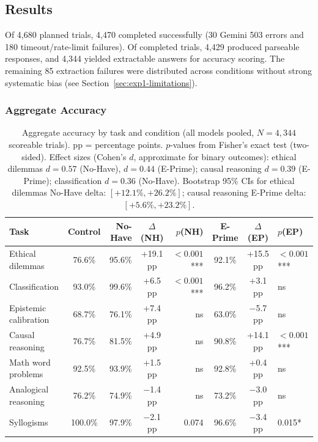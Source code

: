 \documentclass[11pt,a4paper]{article}
\begin{document}
\subsection{Results}

Of 4,680 planned trials, 4,470 completed successfully (30 Gemini 503 errors and 180 timeout/rate-limit failures). Of completed trials, 4,429 produced parseable responses, and 4,344 yielded extractable answers for accuracy scoring. The remaining 85 extraction failures were distributed across conditions without strong systematic bias (see Section~\ref{sec:exp1-limitations}).

\subsubsection{Aggregate Accuracy}

\begin{table}[t]
\centering
\caption{Aggregate accuracy by task and condition (all models pooled, $N{=}4{,}344$ scoreable trials). pp = percentage points. $p$-values from Fisher's exact test (two-sided). Effect sizes (Cohen's $d$, approximate for binary outcomes): ethical dilemmas $d = 0.57$ (No-Have), $d = 0.44$ (E-Prime); causal reasoning $d = 0.39$ (E-Prime); classification $d = 0.36$ (No-Have). Bootstrap 95\% CIs for ethical dilemmas No-Have delta: $[+12.1\%, +26.2\%]$; causal reasoning E-Prime delta: $[+5.6\%, +23.2\%]$.}
\label{tab:aggregate}
\smallskip
\begin{tabular}{@{}lcrcrcc@{}}
\toprule
Task & Control & No-Have & $\Delta$(NH) & $p$(NH) & E-Prime & $\Delta$(EP) & $p$(EP) \\
\midrule
Ethical dilemmas      & 76.6\% & 95.6\% & +19.1 pp & ${<}0.001$*** & 92.1\% & +15.5 pp & ${<}0.001$*** \\
Classification        & 93.0\% & 99.6\% & +6.5 pp  & ${<}0.001$*** & 96.2\% & +3.1 pp  & ns \\
Epistemic calibration & 68.7\% & 76.1\% & +7.4 pp  & ns            & 63.0\% & $-$5.7 pp & ns \\
Causal reasoning      & 76.7\% & 81.5\% & +4.9 pp  & ns            & 90.8\% & +14.1 pp & ${<}0.001$*** \\
Math word problems    & 92.5\% & 93.9\% & +1.5 pp  & ns            & 92.8\% & +0.4 pp  & ns \\
Analogical reasoning  & 76.2\% & 74.9\% & $-$1.4 pp & ns           & 73.2\% & $-$3.0 pp & ns \\
Syllogisms            & 100.0\%& 97.9\% & $-$2.1 pp & 0.074        & 96.6\% & $-$3.4 pp & 0.015* \\
\bottomrule
\end{tabular}
\end{table}
\end{document}
